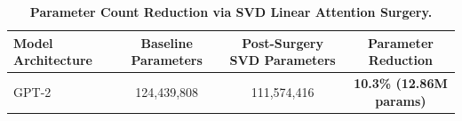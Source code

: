 \begin{table}[h]
\centering
\small
\caption{\textbf{Parameter Count Reduction via SVD Linear Attention Surgery.}}
\label{tab:param_reduction}
\begin{tabular}{lccc}
\toprule
\textbf{Model Architecture} & \textbf{Baseline Parameters} & \textbf{Post-Surgery SVD Parameters} & \textbf{Parameter Reduction} \\
\midrule
GPT-2 & 124,439,808 & 111,574,416 & \textbf{10.3\% (12.86M params)} \\
\bottomrule
\end{tabular}
\end{table}
